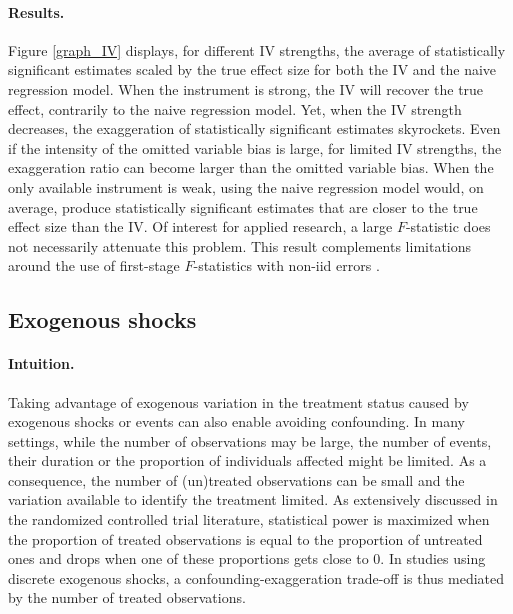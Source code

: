 \documentclass[usletter, 12pt]{article}
\begin{document}
		\paragraph{Results.} 
			Figure \ref{graph_IV} displays, for different IV strengths, the average of statistically significant estimates scaled by the true effect size for both the IV and the naive regression model. When the instrument is strong, the IV will recover the true effect, contrarily to the naive regression model. Yet, when the IV strength decreases, the exaggeration of statistically significant estimates skyrockets. Even if the intensity of the omitted variable bias is large, for limited IV strengths, the exaggeration ratio can become larger than the omitted variable bias. When the only available instrument is weak, using the naive regression model would, on average, produce statistically significant estimates that are closer to the true effect size than the IV. Of interest for applied research, a large $F$-statistic does not necessarily attenuate this problem. This result complements limitations around the use of first-stage $F$-statistics with non-iid errors \citep{young_consistency_2022,lalHow2024}.
		




		\subsection{Exogenous shocks}\label{sim_shocks}
    
        			\paragraph{Intuition.}  Taking advantage of exogenous variation in the treatment status caused by exogenous shocks or events can also enable avoiding confounding. In many settings, while the number of observations may be large, the number of events, their duration or the proportion of individuals affected might be limited. As a consequence, the number of (un)treated observations can be small and the variation available to identify the treatment limited. As extensively discussed in the randomized controlled trial literature, statistical power is maximized when the proportion of treated observations is equal to the proportion of untreated ones and drops when one of these proportions gets close to 0. In studies using discrete exogenous shocks, a confounding-exaggeration trade-off is thus mediated by the number of treated observations. %
			
\end{document}
